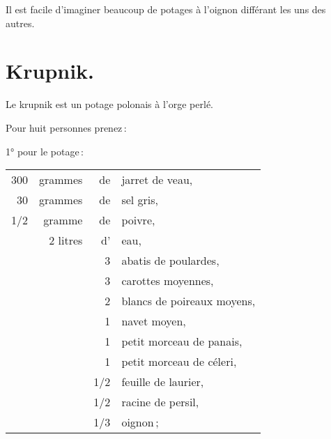 Il est facile d'imaginer beaucoup de potages à l'oignon différant les uns
des autres.


\section*{\centering Krupnik.}

Le krupnik est un potage polonais à l'orge perlé.

\medskip
Pour huit personnes prenez :

\medskip

1° pour le potage :

\medskip

\footnotesize
\begin{longtable}{rrrp{16em}}                                                                             \\
   300 & grammes  &  de & jarret de veau,                                                                 \\
    30 & grammes  &  de & sel gris,                                                                       \\
   1/2 & gramme   &  de & poivre,                                                                         \\
       & 2 litres &  d' & eau,                                                                            \\
       &          &   3 & abatis de poulardes,                                                            \\
       &          &   3 & carottes moyennes,                                                              \\
       &          &   2 & blancs de poireaux moyens,                                                      \\
       &          &   1 & navet moyen,                                                                    \\
       &          &   1 & petit morceau de panais,                                                        \\
       &          &   1 & petit morceau de céleri,                                                        \\
       &          & 1/2 & feuille de laurier,                                                             \\
       &          & 1/2 & racine de persil,                                                               \\
       &          & 1/3 & oignon ;                                                                        \\
\end{longtable}
\normalsize                   

